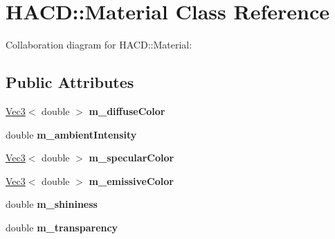 \hypertarget{class_h_a_c_d_1_1_material}{\section{H\+A\+C\+D\+:\+:Material Class Reference}
\label{class_h_a_c_d_1_1_material}
}


Collaboration diagram for H\+A\+C\+D\+:\+:Material\+:
\subsection*{Public Attributes}
\begin{DoxyCompactItemize}
\item 
\hypertarget{class_h_a_c_d_1_1_material_ae04f40f0eae17c580dbc9450f987dbf2}{\hyperlink{class_h_a_c_d_1_1_vec3}{Vec3}$<$ double $>$ {\bfseries m\+\_\+diffuse\+Color}}\label{class_h_a_c_d_1_1_material_ae04f40f0eae17c580dbc9450f987dbf2}

\item 
\hypertarget{class_h_a_c_d_1_1_material_a837eb14cd3b40b651bb9a7263721509c}{double {\bfseries m\+\_\+ambient\+Intensity}}\label{class_h_a_c_d_1_1_material_a837eb14cd3b40b651bb9a7263721509c}

\item 
\hypertarget{class_h_a_c_d_1_1_material_a656435e396ec56aeb01e85773c901d09}{\hyperlink{class_h_a_c_d_1_1_vec3}{Vec3}$<$ double $>$ {\bfseries m\+\_\+specular\+Color}}\label{class_h_a_c_d_1_1_material_a656435e396ec56aeb01e85773c901d09}

\item 
\hypertarget{class_h_a_c_d_1_1_material_aa9b8c603ccd3edc1ef8e2489f6fb3083}{\hyperlink{class_h_a_c_d_1_1_vec3}{Vec3}$<$ double $>$ {\bfseries m\+\_\+emissive\+Color}}\label{class_h_a_c_d_1_1_material_aa9b8c603ccd3edc1ef8e2489f6fb3083}

\item 
\hypertarget{class_h_a_c_d_1_1_material_a1d95587fa42d1858f93d2d888f4da21a}{double {\bfseries m\+\_\+shininess}}\label{class_h_a_c_d_1_1_material_a1d95587fa42d1858f93d2d888f4da21a}

\item 
\hypertarget{class_h_a_c_d_1_1_material_a91e3a2b986a8226513480645ea1ef2a0}{double {\bfseries m\+\_\+transparency}}\label{class_h_a_c_d_1_1_material_a91e3a2b986a8226513480645ea1ef2a0}

\end{DoxyCompactItemize}

